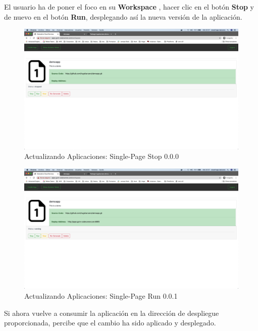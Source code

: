 \documentclass[a4paper,11pt]{book}
\begin{document}
 El usuario ha de poner el foco en su \textbf{Workspace} , hacer clic en el botón \textbf{Stop} y de nuevo en el botón \textbf{Run}, desplegando así la nueva versión de la aplicación. 
 
   \begin{figure}[H]
\centering
\includegraphics[scale=0.2]{imagenes/casouso/2_10.png}
\caption{   Actualizando Aplicaciones: Single-Page Stop 0.0.0  }
\end{figure}
 
 
   \begin{figure}[H]
\centering
\includegraphics[scale=0.2]{imagenes/casouso/2_11.png}
\caption{   Actualizando Aplicaciones: Single-Page Run 0.0.1  }
\end{figure}
 
 Si ahora vuelve a consumir la aplicación en la dirección de despliegue proporcionada, percibe que el cambio ha sido aplicado y desplegado. 
 
\end{document}

